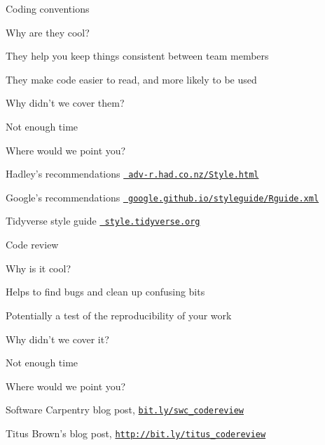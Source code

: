 \documentclass[12pt,t]{beamer}
\begin{document}
\begin{frame}[c]{Coding conventions}

  \bbi
\item[] Why are they cool?
  \bi
  \item They help you keep things consistent between team members
  \item They make code easier to read, and more likely to be used
  \ei
\item[] Why didn't we cover them?
    \bi
    \item Not enough time
    \ei
\item[] Where would we point you?
    \bi
    \item Hadley's recommendations
  \href{http://adv-r.had.co.nz/Style.html}{\tt \footnotesize
    adv-r.had.co.nz/Style.html}
    \item Google's recommendations
  \href{https://google.github.io/styleguide/Rguide.xml}{\tt
      \footnotesize google.github.io/styleguide/Rguide.xml}
\item Tidyverse style guide
  \href{http://style.tidyverse.org/}{\tt \footnotesize
    style.tidyverse.org}
   \ei
\ei


\end{frame}






\begin{frame}[c]{Code review}

  \bbi
\item[] Why is it cool?
  \bi
  \item Helps to find bugs and clean up confusing bits
  \item Potentially a test of the reproducibility of your work
  \ei
\item[] Why didn't we cover it?
    \bi
    \item Not enough time
    \ei
\item[] Where would we point you?
    \bi
  \item Software Carpentry blog post,
    \href{http://bit.ly/swc_codereview}{\tt bit.ly/swc\_codereview}
  \item Titus Brown's blog post,
    \href{http://bit.ly/titus_codereview}{\tt http://bit.ly/titus\_codereview}
   \ei
\ei


\end{frame}
\end{document}
